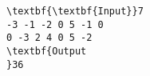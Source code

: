 \begin{verbatim}
\textbf{\textbf{Input}}7
-3 -1 -2 0 5 -1 0
0 -3 2 4 0 5 -2
\textbf{Output
}36 \end{verbatim}